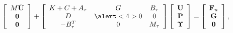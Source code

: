 \begin{frame}
\begin{itemize}
\begin{equation*}
\left[\begin{array}{c}
M\dot{\U}\\
\mathbf{0}\\
\mathbf{0}
\end{array}\right]+\left[\begin{array}{ccc}
K+C+A_\tau&G&B_\tau\\
D&\alert<4>{0}&0\\
-B_\tau^T&0&M_\tau
\end{array}\right]\left[\begin{array}{c}
\U\\
\P\\
\ETA
\end{array}\right]=\left[\begin{array}{c}
\F_u\\
\mathbf{G}\\
\mathbf{0}
\end{array}\right],
\end{equation*}
\end{itemize}
\vspace{-0.2cm}
\end{frame}
